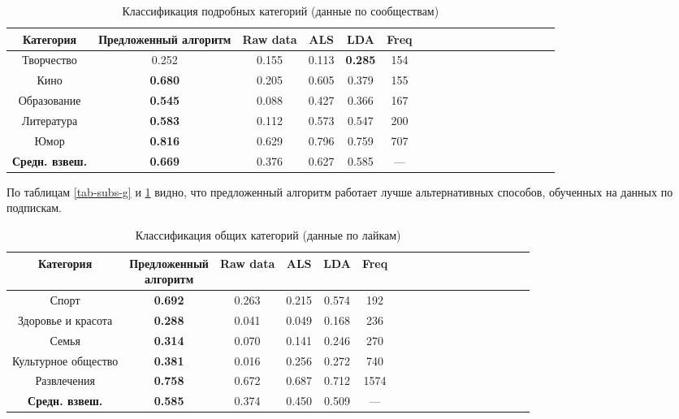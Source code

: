 \documentclass[times,specification,annotation]{itmo-student-thesis}
\begin{document}
\begin{table}[!h]
\caption{Классификация подробных категорий (данные по сообществам)}\label{tab-subs-d}
\centering
\begin{tabular}{|*{18}{c|}}\hline
Категория & Предложенный алгоритм  & Raw data & ALS & LDA & Freq \\\hline
Творчество                    & 0.252 & 0.155 & 0.113 & \textbf{0.285} & 154  \\\hline
Кино       & \textbf{0.680} & 0.205 & 0.605 & 0.379 & 155 \\\hline
Образование   & \textbf{0.545} & 0.088 & 0.427 & 0.366 & 167 \\\hline
Литература  & \textbf{0.583} & 0.112 & 0.573 & 0.547 & 200 \\\hline
Юмор                  & \textbf{0.816} & 0.629 & 0.796 & 0.759 &  707 \\\hline
\textbf{Средн. взвеш.}   & \textbf{0.669} & 0.376 & 0.627 & 0.585  & --- \\\hline
\end{tabular}
\end{table}

По таблицам \ref{tab-subs-g} и \ref{tab-subs-d} видно, что предложенный алгоритм работает лучше альтернативных способов, обученных на данных по подпискам.  

\begin{table}[!h]
\caption{Классификация общих категорий (данные по лайкам)}\label{tab-likes-g}
\centering
\begin{tabular}{|*{18}{c|}}\hline
Категория & \thead{Предложенный \\ алгоритм}  & Raw data & ALS & LDA & Freq \\\hline
Спорт                         &  \textbf{0.692} & 0.263 & 0.215 & 0.574 & 192 \\\hline
Здоровье и красота                         &  \textbf{0.288} & 0.041 & 0.049 & 0.168 & 236 \\\hline
Семья       &  \textbf{0.314} & 0.070 & 0.141 & 0.246 & 270  \\\hline
Культурное общество   &  \textbf{0.381} & 0.016 & 0.256 & 0.272 & 740 \\\hline
Развлечения &  \textbf{0.758} & 0.672 & 0.687 & 0.712 & 1574 \\\hline
\textbf{Средн. взвеш.}                  &  \textbf{0.585} & 0.374 & 0.450 & 0.509 & --- \\\hline
\end{tabular}
\end{table}
\end{document}
